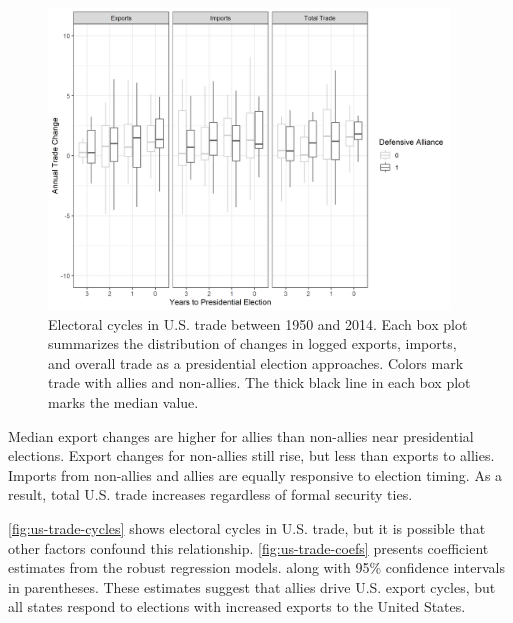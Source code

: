 \documentclass[12pt]{article}
\begin{document}
\begin{figure}
\centering
\includegraphics[width=0.95\textwidth]{../figures/us-trade-cycles-all.png}
\caption{Electoral cycles in U.S. trade between 1950 and 2014. Each box plot summarizes the distribution of changes in logged exports, imports, and overall trade as a presidential election approaches. Colors mark trade with allies and non-allies. The thick black line in each box plot marks the median value.}
\label{fig:us-trade-cycles-all}
\end{figure}


Median export changes are higher for allies than non-allies near presidential elections. 
Export changes for non-allies still rise, but less than exports to allies. 
Imports from non-allies and allies are equally responsive to election timing. 
As a result, total U.S. trade increases regardless of formal security ties.


\autoref{fig:us-trade-cycles} shows electoral cycles in U.S. trade, but it is possible that other factors confound this relationship.
\autoref{fig:us-trade-coefs} presents coefficient estimates from the robust regression models. along with 95\% confidence intervals in parentheses. 
These estimates suggest that allies drive U.S. export cycles, but all states respond to elections with increased exports to the United States. 
\end{document}

